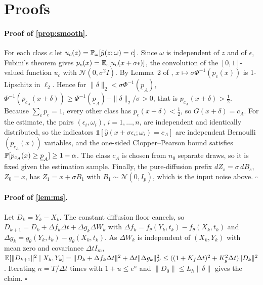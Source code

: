 \appendices


\section{Proofs}\label{app:proofs}
\paragraph{Proof of \cref{prop:smooth}.} For each class $c$ let
$u_c(z)=\mathbb{P}_\omega[\hat y(z;\omega)=c]$. Since $\omega$ is independent of $z$
and of $\epsilon$, Fubini's theorem gives
$p_c(x)=\mathbb{E}_\epsilon[u_c(x+\sigma\epsilon)]$, the convolution of the
$[0,1]$-valued function $u_c$ with $\mathcal N(0,\sigma^2I)$. By Lemma~2 of
\citet{salman2019smoothadv}, $x\mapsto\sigma\Phi^{-1}(p_c(x))$ is 1-Lipschitz in
$\ell_2$. Hence for $\|\delta\|_2<\sigma\Phi^{-1}(\underline p_A)$,
$\Phi^{-1}(p_{c_A}(x+\delta))\ge\Phi^{-1}(\underline p_A)-\|\delta\|_2/\sigma>0$,
that is $p_{c_A}(x+\delta)>\tfrac12$. Because $\sum_cp_c=1$, every other class has
$p_c(x+\delta)<\tfrac12$, so $G(x+\delta)=c_A$. For the estimate, the pairs
$(\epsilon_i,\omega_i)$, $i=1,\dots,n$, are independent and identically
distributed, so the indicators $\mathbb 1[\hat y(x+\sigma\epsilon_i;\omega_i)=c_A]$
are independent Bernoulli$(p_{c_A}(x))$ variables, and the one-sided
Clopper--Pearson bound \citep{clopper1934} satisfies
$\mathbb{P}[p_{c_A}(x)\ge\underline p_A]\ge1-\alpha$. The class $c_A$ is chosen from
$n_0$ separate draws, so it is fixed given the estimation sample. Finally, the
pure-diffusion prefix $dZ_s=\sigma\,dB_s$, $Z_0=x$, has $Z_1=x+\sigma B_1$ with
$B_1\sim\mathcal N(0,I_p)$, which is the input noise above. \hfill$\square$

\paragraph{Proof of \cref{lem:ms}.} Let $D_k=Y_k-X_k$. The constant diffusion
floor cancels, so $D_{k+1}=D_k+\Delta f_k\Delta t+\Delta g_k\Delta W_k$ with
$\Delta f_k=f_\theta(Y_k,t_k)-f_\theta(X_k,t_k)$ and
$\Delta g_k=g_\theta(Y_k,t_k)-g_\theta(X_k,t_k)$. As $\Delta W_k$ is independent
of $(X_k,Y_k)$ with mean zero and covariance $\Delta t I_m$,
$\mathbb{E}[\|D_{k+1}\|^2\mid X_k,Y_k]=\|D_k+\Delta f_k\Delta t\|^2+\Delta t\|\Delta g_k\|_F^2
\le((1+K_f\Delta t)^2+K_g^2\Delta t)\|D_k\|^2$. Iterating $n=T/\Delta t$ times with
$1+u\le e^u$ and $\|D_0\|\le L_h\|\delta\|$ gives the claim. \hfill$\square$

